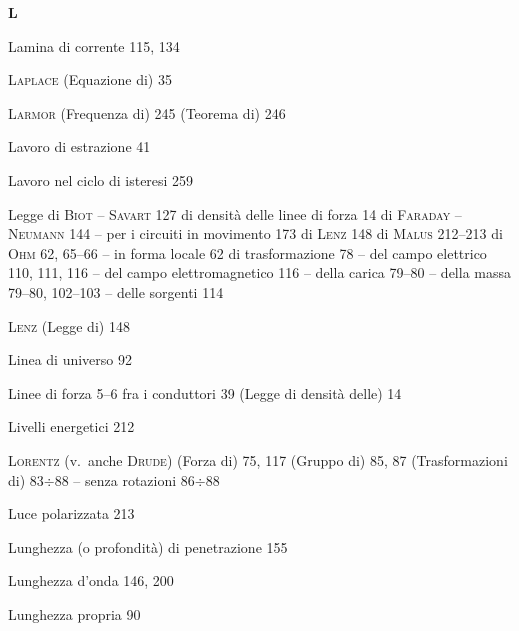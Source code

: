 \begin{theindex}
  \indexspace
  \item \textbf{L}
  \indexspace
  \item Lamina di corrente 115, 134
  \item \textsc{Laplace} (Equazione di) 35
  \item \textsc{Larmor} (Frequenza di) 245
    \subitem (Teorema di) 246
  \item Lavoro di estrazione 41
  \item Lavoro nel ciclo di isteresi 259
  \item Legge
    \subitem di \textsc{Biot} -- \textsc{Savart} 127
    \subitem di densit\`a delle linee di forza 14
    \subitem di \textsc{Faraday} -- \textsc{Neumann} 144
    \subitem -- per i circuiti in movimento 173
    \subitem di \textsc{Lenz} 148
    \subitem di \textsc{Malus} 212--213
    \subitem di \textsc{Ohm} 62, 65--66
    \subitem -- in forma locale 62
    \subitem di trasformazione 78
    \subitem -- del campo elettrico 110, 111, 116
    \subitem -- del campo elettromagnetico 116
    \subitem -- della carica 79--80
    \subitem -- della massa 79--80, 102--103
    \subitem -- delle sorgenti 114
  \item \textsc{Lenz} (Legge di) 148
  \item Linea di universo 92
  \item Linee di forza 5--6
    \subitem fra i conduttori 39
    \subitem (Legge di densit\`a delle) 14
  \item Livelli energetici 212
  \item \textsc{Lorentz} (v.\ anche \textsc{Drude})
    \subitem (Forza di) 75, 117
    \subitem (Gruppo di) 85, 87
    \subitem (Trasformazioni di) 83$\div$88
    \subitem -- senza rotazioni 86$\div$88
  \item Luce polarizzata 213
  \item Lunghezza (o profondit\`a) di penetrazione 155
  \item Lunghezza d'onda 146, 200
  \item Lunghezza propria 90


\end{theindex}
